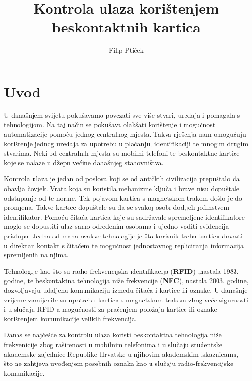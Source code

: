 \documentclass[times, utf8, zavrsni]{fer}
\begin{document}

\title{Kontrola ulaza korištenjem beskontaktnih kartica}

\author{Filip Ptiček}

\maketitle

\izvornik

\zahvala{}

\tableofcontents			

\chapter{Uvod}
U današnjem svijetu pokušavamo povezati sve više stvari, uređaja i pomagala s tehnologijom. Na taj način se pokušava olakšati korištenje i mogućnost automatizacije pomoću jednog centralnog mjesta. Takva rješenja nam omogućuju korištenje jednog uređaja za upotrebu u plaćanju, identifikaciji te mnogim drugim stvarima. Neki od centralnih mjesta su mobilni telefoni te beskontaktne kartice koje se nalaze u džepu većine današnjeg stanovništva.\par
Kontrola ulaza je jedan od poslova koji se od antičkih civilizacija prepuštalo da obavlja čovjek. Vrata koja su koristila mehanizme ključa i brave nisu dopuštale odstupanje od te norme. Tek pojavom kartica s magnetskom trakom došlo je do promjena. Takve kartice dopuštale su da se svakoj osobi dodijeli jedinstveni identifikator. Pomoću čitaća kartica koje su sadržavale spremeljene identifikatore moglo se dopustiti ulaz samo određenim osobama i ujedno voditi evidencija pristupa. Jedna od mana ovakve tehnologije je što korisnik treba karticu dovesti u direktan kontakt s čitaćem te mogućnost jednostavnog repliciranja informacija spremljenih na njima.\par
Tehnologije kao što su radio-frekvencijska identifikacija (\textbf{RFID}) ,nastala 1983. godine, te beskontaktna tehnologija niže frekvencije (\textbf{NFC}), nastala 2003. godine, dozvoljavaju udaljenu komunikaciju između čitaća i kartice ili oznake. U današnje vrijeme zamijenile su upotrebu kartica s magnetskom trakom zbog veće sigurnosti i u slučaju RFID-a mogućnosti za praćenjem položaja kartice ili oznake korištenjem komunikacije velikih frekvencija.\par
Danas se najčešće za kontrolu ulaza koristi beskontaktna tehnologija niže frekvenicije zbog raširenosti u mobilnim telefonima i u slučaju studentske akademske zajednice Republike Hrvatske u njihovim akademskim iskaznicama, što ne zahtjeva uvođenjem posebnih oznaka kao u slučaju radio-frekvencijske komunikacije.
\end{document}
